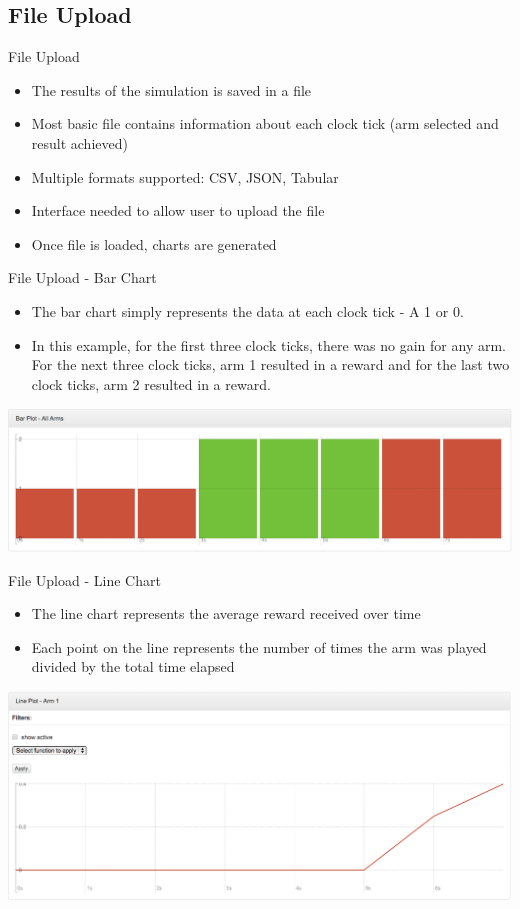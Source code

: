 \documentclass{beamer}
\begin{document}
\subsection{File Upload}
\begin{frame}{File Upload}
 	\begin{itemize}
   		\item The results of the simulation is saved in a file
		\item Most basic file contains information about each clock tick (arm selected and result achieved)
		\item Multiple formats supported: CSV, JSON, Tabular
		\item Interface needed to allow user to upload the file
		\item Once file is loaded, charts are generated
	\end{itemize}
\end{frame}

\begin{frame}{File Upload - Bar Chart}
\begin{itemize}
\item The bar chart simply represents the data at each clock tick - A 1 or 0. 
\item In this example, for the first three clock ticks, there was no gain for any arm. For the next three clock ticks, arm 1 resulted in a reward and for the last two clock ticks, arm 2 resulted in a reward.
\end{itemize}
\includegraphics[scale=0.25]{barchart.png}
\end{frame}

\begin{frame}{File Upload - Line Chart}
\begin{itemize}
\item The line chart represents the average reward received over time
\item Each point on the line represents the number of times the arm was played divided by the total time elapsed
\end{itemize}
\includegraphics[scale=0.25]{linechart.png}
\end{frame}
\end{document}
